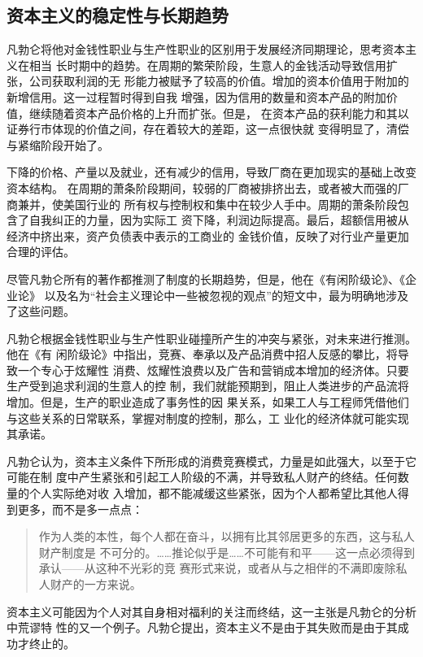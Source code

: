 \subsection{资本主义的稳定性与长期趋势}

凡勃仑将他对金钱性职业与生产性职业的区别用于发展经济同期理论，思考资本主义在相当
长时期中的趋势。在周期的繁荣阶段，生意人的金钱活动导致信用扩张，公司获取利润的无
形能力被赋予了较高的价值。增加的资本价值用于附加的新增信用。这一过程暂时得到自我
增强，因为信用的数量和资本产品的附加价值，继续随着资本产品价格的上升而扩张。但是，
在资本产品的获利能力和其以证券行市体现的价值之间，存在着较大的差距，这一点很快就
变得明显了，清偿与紧缩阶段开始了。

下降的价格、产量以及就业，还有减少的信用，导致厂商在更加现实的基础上改变资本结构。
在周期的萧条阶段期间，较弱的厂商被排挤出去，或者被大而强的厂商兼并，使美国行业的
所有权与控制权和集中在较少人手中。周期的萧条阶段包含了自我纠正的力量，因为实际工
资下降，利润边际提高。最后，超额信用被从经济中挤出来，资产负债表中表示的工商业的
金钱价值，反映了对行业产量更加合理的评估。

尽管凡勃仑所有的著作都推测了制度的长期趋势，但是，他在《有闲阶级论》、《企业论》
以及名为“社会主义理论中一些被忽视的观点”的短文中，最为明确地涉及了这些问题。

凡勃仑根据金钱性职业与生产性职业碰撞所产生的冲突与紧张，对未来进行推测。他在《有
闲阶级论》中指出，竞赛、奉承以及产品消费中招人反感的攀比，将导致一个专心于炫耀性
消费、炫耀性浪费以及广告和营销成本增加的经济体。只要生产受到追求利润的生意人的控
制，我们就能预期到，阻止人类进步的产品流将增加。但是，生产的职业造成了事务性的因
果关系，如果工人与工程师凭借他们与这些关系的日常联系，掌握对制度的控制，那么，工
业化的经济体就可能实现其承诺。

凡勃仑认为，资本主义条件下所形成的消费竞赛模式，力量是如此强大，以至于它可能在制
度中产生紧张和引起工人阶级的不满，并导致私人财产的终结。任何数量的个人实际绝对收
入增加，都不能减缓这些紧张，因为个人都希望比其他人得到更多，而不是多一点点：
\begin{quotation}
  作为人类的本性，每个人都在奋斗，以拥有比其邻居更多的东西，这与私人财产制度是
  不可分的。……推论似乎是……不可能有和平——这一点必须得到承认——从这种不光彩的竞
  赛形式来说，或者从与之相伴的不满即废除私人财产的一方来说。
\end{quotation}

资本主义可能因为个人对其自身相对福利的关注而终结，这一主张是凡勃仑的分析中荒谬特
性的又一个例子。凡勃仑提出，资本主义不是由于其失败而是由于其成功才终止的。

